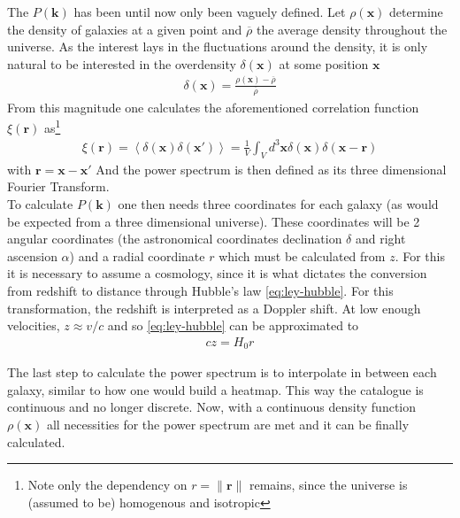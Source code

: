 The $P(\textbf{k})$ has been until now only been vaguely defined. Let  $\rho(\textbf{x})$ determine the density of galaxies at a given point and $ \overline{\rho}$ the average density throughout the universe. As the interest lays in the fluctuations around the density, it is only natural to be interested in the overdensity $\delta(\textbf{x})$ at some position $\textbf{x}$
\begin{align}
	\delta(\textbf{x}) = \frac{\rho\left( \textbf{x} \right) - \overline{\rho}}{\overline{\rho}}
	\label{eq:overdensity}
\end{align}
From this magnitude one calculates the aforementioned correlation function $\xi(\textbf{r})$ as\footnote{Note only the dependency on $r = \|\textbf{r}\|$ remains, since the universe is (assumed to be) homogenous and isotropic}
\begin{align}
	\xi(\textbf{r}) = \left<\delta(\textbf{x}) \delta(\textbf{x}') \right> = \frac{1}{V}\int_{V}^{}  d^3 \textbf{x} \delta(\textbf{x}) \delta\left(\textbf{x} - \textbf{r}  \right) 
	\label{eq:correlation-function}
\end{align} with $\textbf{r} = \textbf{x} - \textbf{x}'$
And the power spectrum is then defined as its three dimensional Fourier Transform. \\

To calculate $P(\textbf{k})$ one then needs three coordinates for each galaxy (as would be expected from a three dimensional universe). These coordinates will be 2 angular coordinates (the astronomical coordinates declination $\delta$ and right ascension $\alpha$) and a radial coordinate $r$ which must be calculated from $z$. For this it is necessary to assume a cosmology, since it is what dictates the conversion from redshift to distance through Hubble's law \eqref{eq:ley-hubble}. For this transformation, the redshift is interpreted as a Doppler shift. At low enough velocities, $z\approx v /c$ and so \eqref{eq:ley-hubble} can be approximated to 
\begin{align}
c z = H_0 r	
\end{align}

The last step to calculate the power spectrum is to interpolate in between each galaxy, similar to how one would build a heatmap. This way the catalogue is continuous and no longer discrete. Now, with a continuous density function $\rho(\textbf{x})$ all necessities for the power spectrum are met and it can be finally calculated. \\

